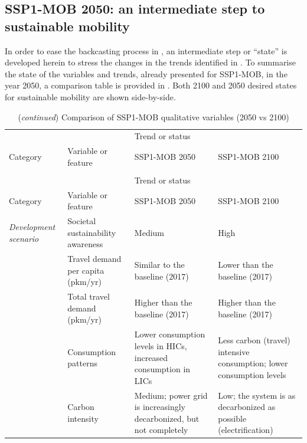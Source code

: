 \subsection{SSP1-MOB 2050: an intermediate step to sustainable mobility}
\label{ss:results:backcasting-2050-intermediate-step}
In order to ease the backcasting process in , an intermediate step or ``state'' is developed herein to stress the changes in the trends identified in . To summarise the state of the variables and trends, already presented for SSP1-MOB, in the year 2050, a comparison table is provided in . Both 2100 and 2050 desired states for sustainable mobility are shown side-by-side.
%
\begin{landscape}
{\scriptsize
\begin{longtable}{p{2.5cm}p{3.5cm}p{6cm}p{6cm}}
\caption[Comparison of SSP1-MOB qualitative variables (2050 vs 2100)]{Comparison of qualitative variables underlying to the 2050 and 2100 SSP1-MOB narratives.}\\
\toprule
& & \multicolumn{2}{l}{Trend or status}\\
\cmidrule(l){3-4} Category & Variable or feature & SSP1-MOB 2050 & SSP1-MOB 2100\\
\midrule
\endfirsthead
\caption*{(\emph{continued}) Comparison of SSP1-MOB qualitative variables (2050 vs 2100)}\\
\toprule
& & \multicolumn{2}{l}{Trend or status}\\
\cmidrule(l){3-4} Category & Variable or feature & SSP1-MOB 2050 & SSP1-MOB 2100\\
\midrule
\endhead
\bottomrule
\endfoot
\bottomrule
\endlastfoot
\label{t:ssp1-mob-2050-narrative-thesis}
\textit{Development scenario} & Societal sustainability awareness & Medium & High \\*
 & Travel demand per capita (pkm/yr) & Similar to the baseline (2017) & Lower than the baseline (2017) \\*
 & Total travel demand (pkm/yr) & Higher than the baseline (2017) & Higher than the baseline (2017) \\*
 & Consumption patterns & Lower consumption levels in HICs, increased consumption in LICs & Less carbon (travel) intensive consumption; lower consumption levels \\*
 & Carbon intensity & Medium; power grid is increasingly decarbonized, but not completely & Low; the system is as decarbonized as possible (electrification) \\*

\end{longtable}}
\end{landscape}
